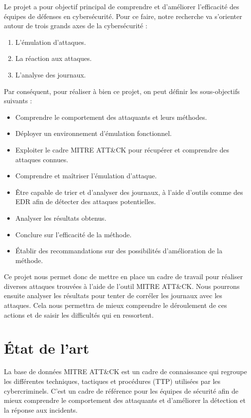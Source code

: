 \documentclass[12pt,letterpaper]{article}
\begin{document}
Le projet a pour objectif principal de comprendre et d'améliorer l'efficacité des équipes de défenses en cybersécurité.
Pour ce faire, notre recherche va s'orienter autour de trois grands axes de la cybersécurité :  
\begin{enumerate}
    \item L'émulation d'attaques.
    \item La réaction aux attaques.
    \item L'analyse des journaux.
\end{enumerate}
Par conséquent, pour réaliser à bien ce projet, on peut définir les sous-objectifs suivants :
\begin{itemize}
    \item Comprendre le comportement des attaquants et leurs méthodes.
    \item Déployer un environnement d'émulation fonctionnel.
    \item Exploiter le cadre MITRE ATT\&CK pour récupérer et comprendre des attaques connues.
    \item Comprendre et maîtriser l'émulation d'attaque.
    \item Être capable de trier et d'analyser des journaux, à l'aide d'outils comme des EDR afin de détecter des attaques potentielles.
    \item Analyser les résultats obtenus.
    \item Conclure sur l'efficacité de la méthode.
    \item Établir des recommandations sur des possibilités d'amélioration de la méthode.
\end{itemize}

Ce projet nous permet donc de mettre en place un cadre de travail pour réaliser diverses attaques trouvées à l'aide de l'outil MITRE ATT\&CK.
Nous pourrons ensuite analyser les résultats pour tenter de corréler les journaux avec les attaques.
Cela nous permettra de mieux comprendre le déroulement de ces actions et de saisir les difficultés qui en ressortent.

\newpage
\section{État de l'art}
La base de données MITRE ATT\&CK est un cadre de connaissance qui regroupe les différentes techniques, tactiques et procédures (TTP) utilisées par les cybercriminels. 
C'est un cadre de référence pour les équipes de sécurité afin de mieux comprendre le comportement des attaquants et d'améliorer la détection et la réponse aux incidents.
\end{document}
